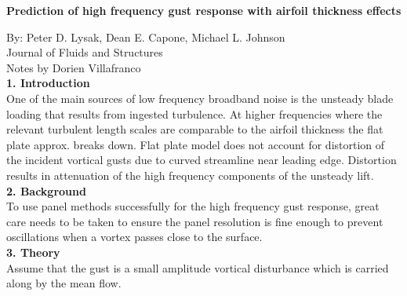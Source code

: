 \documentclass{article}
\begin{document}
\begin{center}
\noindent \textbf{Prediction of high frequency gust response with airfoil thickness effects}\\
\end{center}
By: Peter D. Lysak, Dean E. Capone, Michael L. Johnson\\
Journal of Fluids and Structures\\
Notes by Dorien Villafranco\\

\noindent \textbf{1. Introduction} \\
One of the main sources of low frequency broadband noise is the unsteady blade loading that results from ingested turbulence. At higher frequencies where the relevant turbulent length scales are comparable to the airfoil thickness the flat plate approx. breaks down. Flat plate model does not account for distortion of the incident vortical gusts due to curved streamline near leading edge. Distortion results in attenuation of the high frequency components of the unsteady lift. \\

\noindent \textbf{2. Background}\\
To use panel methods successfully for the high frequency gust response, great care needs to be taken to ensure the panel resolution is fine enough to prevent oscillations when a vortex passes close to the surface.\\

\noindent \textbf{3. Theory}\\
Assume that the gust is a small amplitude vortical disturbance which is carried along by the mean flow. 
\end{document}
